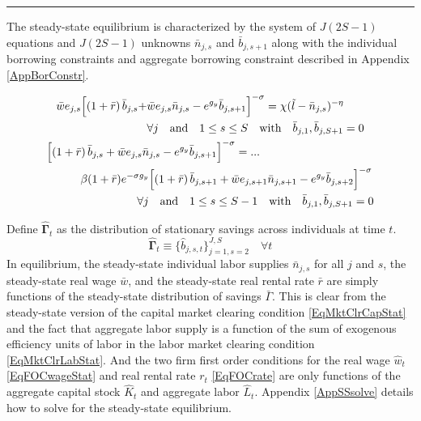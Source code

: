 \documentclass[letterpaper,12pt]{article}
\theoremstyle{definition}
\begin{document}
    \hrule
    \begin{spacing}{1.5}
    \vspace{10mm}

    The steady-state equilibrium is characterized by the system of $J(2S-1)$ equations and $J(2S-1)$ unknowns $\bar{n}_{j,s}$ and $\bar{b}_{j,s+1}$ along with the individual borrowing constraints and aggregate borrowing constraint described in Appendix \ref{AppBorConstr}.

    \begin{gather}
      \begin{split}
        \bar{w}e_{j,s}\Bigl[\left(1+\bar{r}\right)\bar{b}_{j,s} + &\bar{w} e_{j,s}\bar{n}_{j,s} - e^{g_y}\bar{b}_{j,s+1}\Bigr]^{-\sigma} = \chi(\tilde{l} - \bar{n}_{j,s})^{-\eta} \\
        &\forall j \quad\text{and}\quad 1\leq s\leq S \quad\text{with}\quad \bar{b}_{j,1},\bar{b}_{j,S+1}=0
      \end{split} \label{EqEulerLabSS} \\
      \begin{split}
        &\Bigl[\left(1+\bar{r}\right)\bar{b}_{j,s} + \bar{w}e_{j,s}\bar{n}_{j,s} - e^{g_y}\bar{b}_{j,s+1}\Bigr]^{-\sigma} = ... \\
        &\quad\quad\quad \beta(1+\bar{r})e^{-\sigma g_y}\Bigl[\left(1+\bar{r}\right)\bar{b}_{j,s+1} + \bar{w}e_{j,s+1}\bar{n}_{j,s+1} - e^{g_y}\bar{b}_{j,s+2}\Bigr]^{-\sigma} \\
        &\quad\quad\quad\quad\quad\quad\quad\quad\forall j \quad\text{and}\quad 1\leq s\leq S-1 \quad\text{with}\quad \bar{b}_{j,1},\bar{b}_{j,S+1}=0
      \end{split} \label{EqEulerSavSS}
    \end{gather}

    Define $\bm{\hat{\Gamma}}_t$ as the distribution of stationary savings across individuals at time $t$.
    \begin{equation}\label{EqSavDist}
      \bm{\hat{\Gamma}}_t \equiv \{\hat{b}_{j,s,t}\}_{j=1,s=2}^{J,S} \quad\forall t
    \end{equation}
    In equilibrium, the steady-state individual labor supplies $\bar{n}_{j,s}$ for all $j$ and $s$, the steady-state real wage $\bar{w}$, and the steady-state real rental rate $\bar{r}$ are simply functions of the steady-state distribution of savings $\bar{\Gamma}$. This is clear from the steady-state version of the capital market clearing condition \eqref{EqMktClrCapStat} and the fact that aggregate labor supply is a function of the sum of exogenous efficiency units of labor in the labor market clearing condition \eqref{EqMktClrLabStat}. And the two firm first order conditions for the real wage $\hat{w}_t$ \eqref{EqFOCwageStat} and real rental rate $r_t$ \eqref{EqFOCrate} are only functions of the aggregate capital stock $\hat{K}_t$ and aggregate labor $\hat{L}_t$. Appendix \ref{AppSSsolve} details how to solve for the steady-state equilibrium.


\end{spacing}
\end{document}
